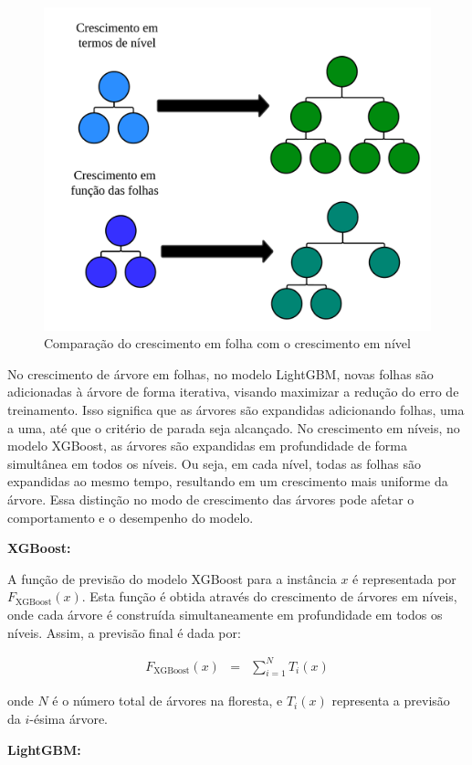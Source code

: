  \begin{figure}[!htb]
 	\centering
 	\caption{Comparação do crescimento em folha com o crescimento em nível}
 	\label{fig:xgboost}
 	\includegraphics[width=0.7\linewidth]{Modelos/Figuras/xgboost.pdf}
 \end{figure}
 
 
 No crescimento de árvore em folhas, no modelo LightGBM, novas folhas são adicionadas à árvore de forma iterativa, visando maximizar a redução do erro de treinamento. Isso significa que as árvores são expandidas adicionando folhas, uma a uma, até que o critério de parada seja alcançado.  No crescimento em níveis, no modelo XGBoost, as árvores são expandidas em profundidade de forma simultânea em todos os níveis. Ou seja, em cada nível, todas as folhas são expandidas ao mesmo tempo, resultando em um crescimento mais uniforme da árvore. Essa distinção no modo de crescimento das árvores pode afetar o comportamento e o desempenho do modelo. 
  
 \noindent\textbf{XGBoost:}
 
 A função de previsão do modelo XGBoost para a instância $x$ é representada por $F_{\text{XGBoost}}(x)$. Esta função é obtida através do crescimento de árvores em níveis, onde cada árvore é construída simultaneamente em profundidade em todos os níveis. Assim, a previsão final é dada por:
 
 \begin{eqnarray}
 F_{\text{XGBoost}}(x) &=& \sum_{i=1}^{N} T_i(x)
 \end{eqnarray}
 
 \noindent onde $N$ é o número total de árvores na floresta, e $T_i(x)$ representa a previsão da $i$-ésima árvore.
 
\noindent\textbf{LightGBM:}
 
